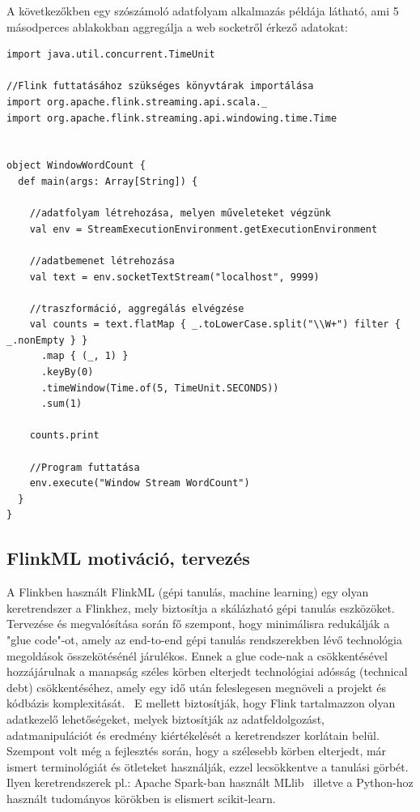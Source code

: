 \documentclass[a4paper,12pt]{article}
\begin{document}
A következőkben egy szószámoló adatfolyam alkalmazás példája látható, ami 5 másodperces ablakokban aggregálja a web socketről érkező adatokat:

\begin{lstlisting}[style=Scala]
import java.util.concurrent.TimeUnit

//Flink futtatásához szükséges könyvtárak importálása
import org.apache.flink.streaming.api.scala._
import org.apache.flink.streaming.api.windowing.time.Time


object WindowWordCount {
  def main(args: Array[String]) {

    //adatfolyam létrehozása, melyen műveleteket végzünk
    val env = StreamExecutionEnvironment.getExecutionEnvironment
    
    //adatbemenet létrehozása
    val text = env.socketTextStream("localhost", 9999)

	//traszformáció, aggregálás elvégzése
    val counts = text.flatMap { _.toLowerCase.split("\\W+") filter { _.nonEmpty } }
      .map { (_, 1) }
      .keyBy(0)
      .timeWindow(Time.of(5, TimeUnit.SECONDS))
      .sum(1)

    counts.print

	//Program futtatása
    env.execute("Window Stream WordCount")
  }
}
\end{lstlisting}


\subsection{FlinkML motiváció, tervezés}

A Flinkben használt FlinkML (gépi tanulás, machine learning) egy olyan keretrendszer a Flinkhez, mely biztosítja a skálázható gépi tanulás eszközöket. Tervezése és megvalósítása során fő szempont, hogy minimálisra redukálják a "glue code"-ot, amely az end-to-end gépi tanulás rendszerekben lévő technológia megoldások összekötésénél járulékos. Ennek a glue code-nak a csökkentésével hozzájárulnak a manapság széles körben elterjedt technológiai adósság (technical debt) csökkentéséhez, amely egy idő után feleslegesen megnöveli a projekt és kódbázis komplexitását.~\cite{mldebt} E mellett biztosítják, hogy Flink tartalmazzon olyan adatkezelő lehetőségeket, melyek biztosítják az adatfeldolgozást, adatmanipulációt és eredmény kiértékelését a keretrendszer korlátain belül. Szempont volt még a fejlesztés során, hogy a szélesebb körben elterjedt, már ismert terminológiát és ötleteket használják, ezzel lecsökkentve a tanulási görbét. Ilyen keretrendszerek pl.: Apache Spark-ban használt MLlib~\cite{mllib} illetve a Python-hoz használt tudományos körökben is elismert scikit-learn.~\cite{scikit} \newline
\end{document}
